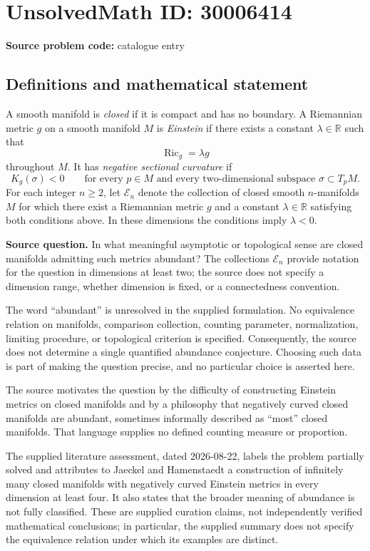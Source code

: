 \documentclass[11pt]{article}
\newcommand{\R}{\mathbb{R}}
\begin{document}
\section*{UnsolvedMath ID: 30006414}
\textbf{Source problem code:} catalogue entry
\subsection{Definitions and mathematical statement}
A smooth manifold is \emph{closed} if it is compact and has no boundary. A Riemannian metric \(g\) on a smooth manifold \(M\) is \emph{Einstein} if there exists a constant \(\lambda\in\R\) such that
\[
\operatorname{Ric}_g=\lambda g
\]
throughout \(M\). It has \emph{negative sectional curvature} if
\[
K_g(\sigma)<0\qquad\text{for every }p\in M\text{ and every two-dimensional subspace }\sigma\subset T_pM.
\]
For each integer \(n\geq2\), let \(\mathcal E_n\) denote the collection of closed smooth \(n\)-manifolds \(M\) for which there exist a Riemannian metric \(g\) and a constant \(\lambda\in\R\) satisfying both conditions above. In these dimensions the conditions imply \(\lambda<0\).

\textbf{Source question.} In what meaningful asymptotic or topological sense are closed manifolds admitting such metrics abundant? The collections \(\mathcal E_n\) provide notation for the question in dimensions at least two; the source does not specify a dimension range, whether dimension is fixed, or a connectedness convention.

The word ``abundant'' is unresolved in the supplied formulation. No equivalence relation on manifolds, comparison collection, counting parameter, normalization, limiting procedure, or topological criterion is specified. Consequently, the source does not determine a single quantified abundance conjecture. Choosing such data is part of making the question precise, and no particular choice is asserted here.

The source motivates the question by the difficulty of constructing Einstein metrics on closed manifolds and by a philosophy that negatively curved closed manifolds are abundant, sometimes informally described as ``most'' closed manifolds. That language supplies no defined counting measure or proportion.

The supplied literature assessment, dated 2026-08-22, labels the problem partially solved and attributes to Jaeckel and Hamenstaedt a construction of infinitely many closed manifolds with negatively curved Einstein metrics in every dimension at least four. It also states that the broader meaning of abundance is not fully classified. These are supplied curation claims, not independently verified mathematical conclusions; in particular, the supplied summary does not specify the equivalence relation under which its examples are distinct.
\end{document}
